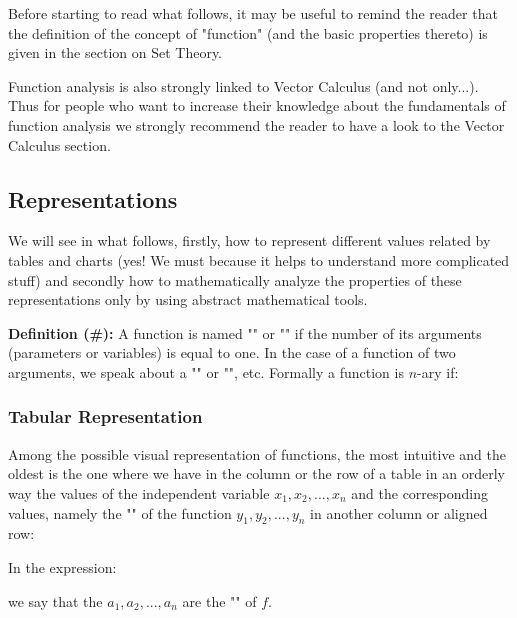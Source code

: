 	\begin{tcolorbox}[title=Remark,colframe=black,arc=10pt]
Before starting to read what follows, it may be useful to remind the reader that the definition of the concept of "function" (and the basic properties thereto) is given in the section on Set Theory.
	\end{tcolorbox}	

	Function analysis is also strongly linked to Vector Calculus (and not only...). Thus for people who want to increase their knowledge about the fundamentals of function analysis we strongly recommend the reader to have a look to the Vector Calculus section.

\pagebreak
\subsection{Representations}

	We will see in what follows, firstly, how to represent different values related by tables and charts (yes! We must because it helps to understand more complicated stuff) and secondly how to mathematically analyze the properties of these representations only by using abstract mathematical tools.

	\textbf{Definition (\#\mydef):} A function is named "" or  "" if the number of its arguments (parameters or variables) is equal to one. In the case of a function of two arguments, we speak about a "" or "", etc. Formally a function is $n$-ary if:
	

\subsubsection{Tabular Representation}

Among the possible visual representation of functions, the most intuitive and the oldest is the one where we have in the column or the row of a table in an orderly way the values of the independent variable $x_1,x_2,...,x_n$ and the corresponding values, namely the "" of the function $y_1,y_2,...,y_n$ in another column or aligned row:

		
	
	In the expression:
	
	we say that the $a_1,a_2,...,a_n$ are the "" of $f$.

